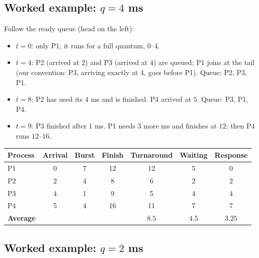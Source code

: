 \documentclass[11pt,a4paper]{article}
\begin{document}
\subsection{Worked example: $q = 4$ ms}

\begin{center}
\end{center}

Follow the ready queue (head on the left):
\begin{itemize}
  \item $t=0$: only P1; it runs for a full quantum, $0$--$4$.
  \item $t=4$: P2 (arrived at $2$) and P3 (arrived at $4$) are queued; P1 joins at the tail (our convention: P3, arriving exactly at $4$, goes before P1). Queue: P2, P3, P1.
  \item $t=8$: P2 has used its $4$ ms and is finished. P4 arrived at $5$. Queue: P3, P1, P4.
  \item $t=9$: P3 finished after $1$ ms. P1 needs $3$ more ms and finishes at $12$; then P4 runs $12$--$16$.
\end{itemize}

\begin{center}
\renewcommand{\arraystretch}{1.2}
\begin{tabular}{@{}lcccccc@{}}
\toprule
\textbf{Process} & \textbf{Arrival} & \textbf{Burst} & \textbf{Finish} & \textbf{Turnaround} & \textbf{Waiting} & \textbf{Response}\\
\midrule
P1 & 0 & 7 & 12 & 12 & 5 & 0\\
P2 & 2 & 4 & 8 & 6 & 2 & 2\\
P3 & 4 & 1 & 9 & 5 & 4 & 4\\
P4 & 5 & 4 & 16 & 11 & 7 & 7\\
\midrule
\textbf{Average} & & & & $8.5$ & $4.5$ & $3.25$\\
\bottomrule
\end{tabular}
\end{center}

\subsection{Worked example: $q = 2$ ms}

\begin{center}
\end{center}
\end{document}
